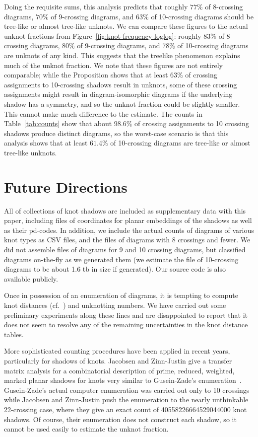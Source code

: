 \documentclass[amsmath,secnumarabic,floatfix,amssymb,nofootinbib,nobibnotes,letterpaper,11pt,tightenlines,showkeys]{revtex4}
\theoremstyle{definition}
\begin{document}
Doing the requisite sums, this analysis predicts that roughly $77\%$ of 8-crossing diagrams, $70\%$ of 9-crossing diagrams, and $63\%$ of 10-crossing diagrams should be tree-like or almost tree-like unknots. We can compare these figures to the actual unknot fractions from Figure~\ref{fig:knot frequency loglog}: roughly $83\%$ of 8-crossing diagrams, $80\%$ of 9-crossing diagrams, and $78\%$ of 10-crossing diagrams are unknots of any kind. This suggests that the treelike phenomenon explains much of the unknot fraction. We note that these figures are not entirely comparable; while the Proposition shows that at least $63\%$ of crossing assignments to 10-crossing shadows result in unknots, some of these crossing assignments might result in diagram-isomorphic diagrams if the underlying shadow has a symmetry, and so the unknot fraction could be slightly smaller. This cannot make much difference to the estimate. The counts in Table~\ref{tab:counts} show that about $98.6\%$ of crossing assignments to 10 crossing shadows produce distinct diagrams, so the worst-case scenario is that this analysis shows that at least $61.4\%$ of 10-crossing diagrams are tree-like or almost tree-like unknots.

\section{Future Directions}

All of collections of knot shadows are included as supplementary data with this paper, including files of coordinates for planar embeddings of the shadows as well as their pd-codes. In addition, we include the actual counts of diagrams of various knot types as CSV files, and the files of diagrams with 8 crossings and fewer. We did not assemble files of diagrams for 9 and 10 crossing diagrams, but classified diagrams on-the-fly as we generated them (we estimate the file of 10-crossing diagrams to be about 1.6 tb in size if generated). Our source code is also available publicly. 

Once in possession of an enumeration of diagrams, it is tempting to compute knot distances (cf.~\cite{DARCY:2001fi,MoonHyeyoung:2010tm}) and unknotting numbers. We have carried out some preliminary experiments along these lines and are disappointed to report that it does not seem to resolve any of the remaining uncertainties in the knot distance tables.

More sophisticated counting procedures have been applied in recent years, particularly for shadows of knots. Jacobsen and Zinn-Justin\cite{Jacobsen:2002kia} give a transfer matrix analysis for a combinatorial description of prime, reduced, weighted, marked planar shadows for knots very similar to Gusein-Zade's enumeration~\cite{GusenZade:1994wl,GusenZade:1998jz}. Gusein-Zade's actual computer enumeration was carried out only to 10 crossings while Jacobsen and Zinn-Justin push the enumeration to the nearly unthinkable 22-crossing case, where they give an exact count of 40558226664529044000 knot shadows. Of course, their enumeration does not construct each shadow, so it cannot be used easily to estimate the unknot fraction.
\end{document}
